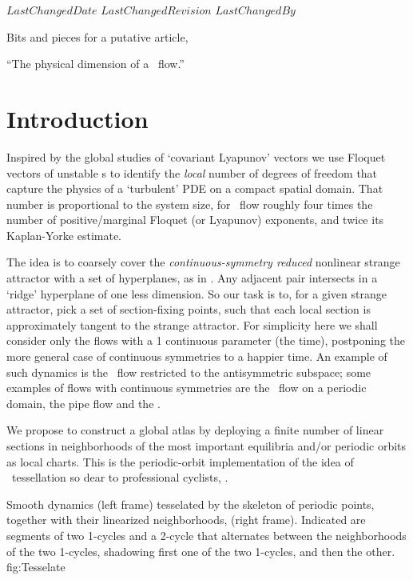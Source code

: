 \ifsvnmulti
 {$LastChangedDate$}
 {$LastChangedRevision$} {$LastChangedBy$}
\fi

Bits and pieces for a putative article,

``The physical dimension of a \KS\ flow.''

\section{Introduction}
\label{sect:intro}

Inspired by the global
studies of
`covariant Lyapunov' vectors we use Floquet vectors of unstable \po s to
identify the \emph{local} number of degrees of freedom that capture the
physics of a `turbulent' PDE on a compact spatial domain. That number is
proportional to the system size, for \KS\ flow roughly four times the
number of positive/marginal Floquet (or Lyapunov) exponents, and twice its
Kaplan-Yorke estimate.

The idea is to coarsely cover the \emph{continuous-symmetry reduced}
nonlinear strange attractor with a set of
hyperplanes, as in . Any
adjacent pair intersects in a `ridge' hyperplane of one less dimension.
So our task is to, for a given strange attractor, pick a set of \Poincare
section-fixing points, such that each local section is approximately tangent to the
strange attractor. For simplicity here we shall consider only the flows
with a 1 continuous parameter (the time), postponing the more general
case of continuous symmetries to a happier time. An example of such
dynamics is the \KS\ flow restricted to the antisymmetric
subspace;
some examples of flows with continuous
symmetries are the \KS\ flow on a periodic domain, the pipe
flow and the \pCf{}.

We propose to construct a global atlas by deploying a finite
number of linear \Poincare sections in
neighborhoods of the most important equilibria and/or periodic orbits
as local charts.
This is the periodic-orbit implementation of the idea of {\statesp\
tessellation} so dear to professional cyclists, .

{}{
Smooth dynamics  (left frame) tesselated by the skeleton of periodic
points, together with their linearized neighborhoods, (right frame).
Indicated are segments of two 1-cycles and a 2-cycle that alternates
between the neighborhoods of the two 1-cycles, shadowing first one of the
two 1-cycles, and then the other.
}{fig:Tesselate} %
%
%


